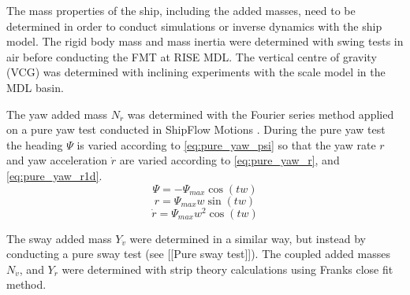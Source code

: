 The mass properties of the ship, including the added masses, need to be determined in order to conduct simulations or inverse dynamics with the ship model. The rigid body mass and mass inertia were determined with swing tests in air before conducting the FMT at RISE MDL. The vertical centre of gravity (VCG) was determined with inclining experiments with the scale model in the MDL basin.

The yaw added mass $N_{\dot{r}}$ was determined with the Fourier series method \citep{sakamotoURANSSimulationsStatic2012} applied on a pure yaw test conducted in ShipFlow Motions \citep{kjellbergFullyNonlinearUnsteady2013}.
During the pure yaw test the heading $\Psi$ is varied according to \autoref{eq:pure_yaw_psi} so that the yaw rate $r$ and yaw acceleration $\dot{r}$ are varied according to \autoref{eq:pure_yaw_r}, and \autoref{eq:pure_yaw_r1d}.
\begin{equation}
    \Psi = - \Psi_{max} \cos{\left(t w \right)}
    \label{eq:pure_yaw_psi}
\end{equation}
\begin{equation}
    r = \Psi_{max} w \sin{\left(t w \right)}
    \label{eq:pure_yaw_r}
\end{equation}
\begin{equation}
    \dot{r} = \Psi_{max} w^{2} \cos{\left(t w \right)}
    \label{eq:pure_yaw_r1d}
\end{equation}


The sway added mass $Y_{\dot{v}}$ were determined in a similar way, but instead by conducting a pure sway test (see [[Pure sway test]]). The coupled added masses $N_{\dot{v}}$, and $Y_{\dot{r}}$ were determined with strip theory calculations using Franks close fit method.